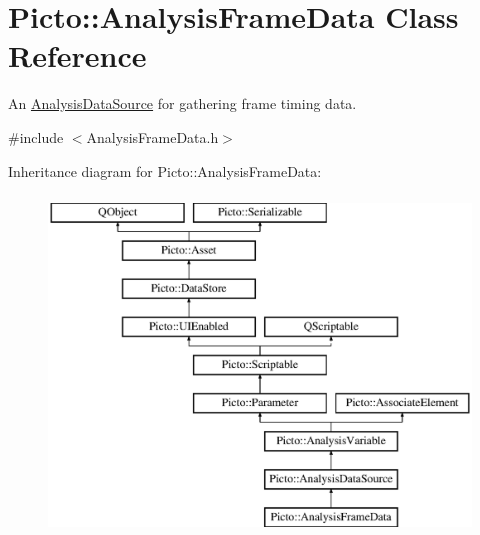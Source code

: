\hypertarget{class_picto_1_1_analysis_frame_data}{\section{Picto\-:\-:Analysis\-Frame\-Data Class Reference}
\label{class_picto_1_1_analysis_frame_data}
}


An \hyperlink{class_picto_1_1_analysis_data_source}{Analysis\-Data\-Source} for gathering frame timing data.  




{\ttfamily \#include $<$Analysis\-Frame\-Data.\-h$>$}

Inheritance diagram for Picto\-:\-:Analysis\-Frame\-Data\-:\begin{figure}[H]
\begin{center}
\leavevmode
\includegraphics[height=9.000000cm]{class_picto_1_1_analysis_frame_data}
\end{center}
\end{figure}
